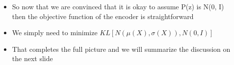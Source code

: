 \begin{frame}
\begin{columns}
\begin{overlayarea}{\textwidth}{\textheight}
		\end{overlayarea}
		\begin{overlayarea}{\textwidth}{\textheight}
			\begin{itemize}\justifying
				\item<1-> So now that we are convinced that it is okay to assume P(z) is N(0, I) then the objective function of the encoder is straightforward
				\item<2-> We simply need to minimize $KL[N(\mu(X), \sigma(X)), N(0, I)]$
				\item<3-> That completes the full picture and we will summarize the discussion on the next slide
			\end{itemize}
		\end{overlayarea}
	\end{columns}
\end{frame}


